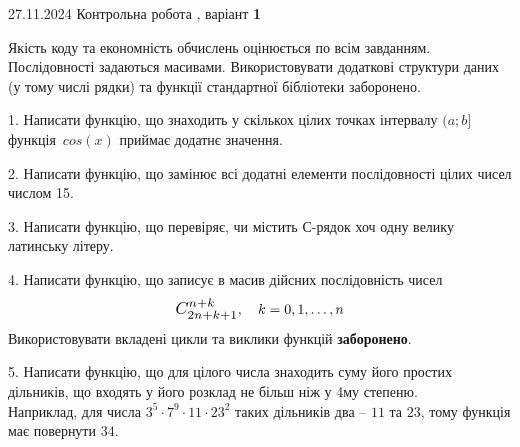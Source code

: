 \documentclass[12pt, ukrainian]{article}
\begin{document}
{{27.11.2024 Контрольна робота , варіант  \No \textbf { 1 }\par}}


{
Якість коду та економність обчислень оцінюється по всім завданням. Послідовності задаються масивами. Використовувати додаткові структури даних (у тому числі рядки) та функції стандартної бібліотеки заборонено.

\vspace{2mm}

\begin {large}
1. Написати функцію, що знаходить у скількох цілих точках інтервалу $(a; b]$ функція~$cos(x)$ приймає додатнє значення.

\vspace{2mm}


2. Написати функцію, що замінює всі додатні елементи послідовності цілих чисел числом 15.

\vspace{2mm}


3. Написати функцію, що перевіряє, чи містить С-рядок хоч одну велику латинську літеру.

\vspace{2mm}


4. 
Написати функцію, що записує в масив дійсних послідовність чисел
$$\scalebox{1.2}{$C_{2n+k+1}^{n+k}$}, \quad k=0,1,\ldots,n$$
Використовувати вкладені цикли та виклики функцій \textbf{заборонено}.

\vspace{2mm}


5. Написати функцію, що для цілого числа знаходить суму його простих дільників, що входять у його розклад не більш ніж у 4му степеню. \\ Наприклад, для числа $3^5{\cdot}7^9{\cdot}11{\cdot}23^{2}$ таких дільників два – $11$ та $23$, тому функція має повернути $34$.

\vspace{2mm}


\end{large}}
\end{document}

